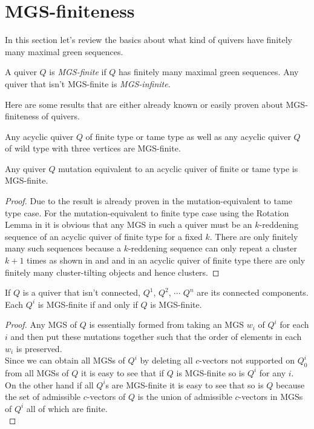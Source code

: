 \section{MGS-finiteness}
\indent In this section let's review the basics about what kind of quivers have finitely many maximal green sequences.
\begin{definition}
A quiver $Q$ is \textit{MGS-finite} if $Q$ has finitely many maximal green sequences. Any quiver that isn't MGS-finite is \textit{MGS-infinite}.
\end{definition}
\indent Here are some results that are either already known or easily proven about MGS-finiteness of quivers.
\begin{theorem}
\cite{BDP13}Any acyclic quiver $Q$ of finite type or tame type as well as any acyclic quiver $Q$ of wild type with three vertices are MGS-finite.
\end{theorem}
\begin{theorem}
Any quiver $Q$ mutation equivalent to an acyclic quiver of finite or tame type is MGS-finite.
\end{theorem}
\begin{proof}
Due to \cite{BHIT15} the result is already proven in the mutation-equivalent to tame type case. For the mutation-equivalent to finite type case using the Rotation Lemma in \cite{BHIT15} it is obvious that any MGS in such a quiver must be an $k$-reddening sequence of an acyclic quiver of finite type for a fixed $k$. There are only finitely many such sequences because a $k$-reddening sequence can only repeat a cluster $k+1$ times as shown in \cite{BHIT15} and \cite{IZ17} and in an acyclic quiver of finite type there are only finitely many cluster-tilting objects and hence clusters.
\end{proof}
\begin{lemma}
If $Q$ is a quiver that isn't connected, $Q^1$, $Q^2$, $\cdots$ $Q^n$ are its connected components. Each $Q^i$ is MGS-finite if and only if $Q$ is MGS-finite.
\end{lemma}
\begin{proof}
\indent Any MGS of $Q$ is essentially formed from taking an MGS $w_i$ of $Q^i$ for each $i$ and then put these mutations together such that the order of elements in each $w_i$ is preserved.\\ 
\indent Since we can obtain all MGSs of $Q^i$ by deleting all $c$-vectors not supported on $Q^i_0$ from all MGSs of $Q$ it is easy to see that if $Q$ is MGS-finite so is $Q^i$ for any $i$.\\
\indent On the other hand if all $Q^i$s are MGS-finite it is easy to see that so is $Q$ because the set of admissible $c$-vectors of $Q$ is the union of admissible $c$-vectors in MGSs of $Q^i$ all of which are finite.\\
\end{proof}
